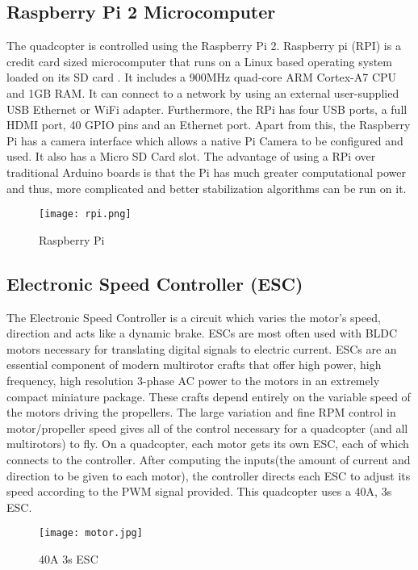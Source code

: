 \subsection{Raspberry Pi 2 Microcomputer}
The quadcopter is controlled using the Raspberry Pi 2. Raspberry pi (RPI) is a credit card sized microcomputer that runs on a Linux based operating system loaded on its SD card . It includes a 900MHz quad-core ARM Cortex-A7 CPU and 1GB RAM.
It can connect to a network by using an external user-supplied USB Ethernet or WiFi adapter. Furthermore, the RPi has four USB ports, a full HDMI port, 40 GPIO pins and an Ethernet port. Apart from this, the Raspberry Pi has a camera interface which allows a native Pi Camera to be configured and used. It also has a Micro SD Card slot. The advantage of using a RPi over traditional Arduino boards is that the Pi has much greater computational power and thus, more complicated and better stabilization algorithms can be run on it.

\begin{figure}[H]
  \centering
  \texttt{[image: rpi.png]}
  \caption{Raspberry Pi}
  \label{RPi}	
\end{figure}

\subsection{Electronic Speed Controller (ESC)}
The Electronic Speed Controller is a circuit which varies the motor's speed, direction and acts like a dynamic brake. ESCs are most often used with BLDC motors necessary for translating digital signals to electric current. ESCs are an essential component of modern multirotor crafts that offer high power, high frequency, high resolution 3-phase AC power to the motors in an extremely compact miniature package. These crafts depend entirely on the variable speed of the motors driving the propellers. The large variation and fine RPM control in motor/propeller speed gives all of the control necessary for a quadcopter (and all multirotors) to fly. On a quadcopter, each motor gets its own ESC, each of which connects to the controller. After computing the inputs(the amount of current and direction to be given to each motor), the controller directs each ESC to adjust its speed according to the PWM signal provided.
This quadcopter uses a 40A, 3s ESC.
\begin{figure}[H]
  \centering
  \texttt{[image: motor.jpg]}
  \caption{40A 3s ESC}
  \label{40A 3s ESC}	
\end{figure}



